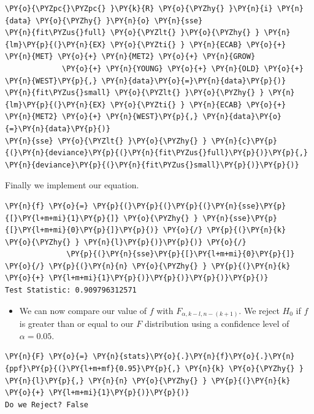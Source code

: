\documentclass[10pt]{article}\usepackage[]{graphicx}\usepackage[]{xcolor}
\begin{document}
    \begin{Verbatim}[commandchars=\\\{\}]
\PY{o}{\PYZpc{}\PYZpc{} }\PY{k}{R} \PY{o}{\PYZhy{} }\PY{n}{i} \PY{n}{data} \PY{o}{\PYZhy{} }\PY{n}{o} \PY{n}{sse}
\PY{n}{fit\PYZus{}full} \PY{o}{\PYZlt{} }\PY{o}{\PYZhy{} } \PY{n}{lm}\PY{p}{(}\PY{n}{EX} \PY{o}{\PYZti{} } \PY{n}{ECAB} \PY{o}{+} \PY{n}{MET} \PY{o}{+} \PY{n}{MET2} \PY{o}{+} \PY{n}{GROW}
             \PY{o}{+} \PY{n}{YOUNG} \PY{o}{+} \PY{n}{OLD} \PY{o}{+} \PY{n}{WEST}\PY{p}{,} \PY{n}{data}\PY{o}{=}\PY{n}{data}\PY{p}{)}
\PY{n}{fit\PYZus{}small} \PY{o}{\PYZlt{} }\PY{o}{\PYZhy{} } \PY{n}{lm}\PY{p}{(}\PY{n}{EX} \PY{o}{\PYZti{} } \PY{n}{ECAB} \PY{o}{+} \PY{n}{MET2} \PY{o}{+} \PY{n}{WEST}\PY{p}{,} \PY{n}{data}\PY{o}{=}\PY{n}{data}\PY{p}{)}
\PY{n}{sse} \PY{o}{\PYZlt{} }\PY{o}{\PYZhy{} } \PY{n}{c}\PY{p}{(}\PY{n}{deviance}\PY{p}{(}\PY{n}{fit\PYZus{}full}\PY{p}{)}\PY{p}{,} \PY{n}{deviance}\PY{p}{(}\PY{n}{fit\PYZus{}small}\PY{p}{)}\PY{p}{)}
\end{Verbatim}

    Finally we implement our equation.

\begin{Verbatim}[commandchars=\\\{\}]
\PY{n}{f} \PY{o}{=} \PY{p}{(}\PY{p}{(}\PY{p}{(}\PY{n}{sse}\PY{p}{[}\PY{l+m+mi}{1}\PY{p}{]} \PY{o}{\PYZhy{} } \PY{n}{sse}\PY{p}{[}\PY{l+m+mi}{0}\PY{p}{]}\PY{p}{)} \PY{o}{/} \PY{p}{(}\PY{n}{k} \PY{o}{\PYZhy{} } \PY{n}{l}\PY{p}{)}\PY{p}{)} \PY{o}{/}
              \PY{p}{(}\PY{n}{sse}\PY{p}{[}\PY{l+m+mi}{0}\PY{p}{]} \PY{o}{/} \PY{p}{(}\PY{n}{n} \PY{o}{\PYZhy{} } \PY{p}{(}\PY{n}{k} \PY{o}{+} \PY{l+m+mi}{1}\PY{p}{)}\PY{p}{)}\PY{p}{)}\PY{p}{)}
Test Statistic: 0.909796312571
\end{Verbatim}

    \begin{itemize}
\itemsep1pt\parskip0pt
\item
  We can now compare our value of $f$ with $F_{\alpha, k - l, n - (k + 1)}$. We reject $H_0$ if $f$ is greater than or
  equal to our $F$ distribution using a confidence level of $\alpha = 0.05$.
\end{itemize}

\begin{Verbatim}[commandchars=\\\{\}]
\PY{n}{F} \PY{o}{=} \PY{n}{stats}\PY{o}{.}\PY{n}{f}\PY{o}{.}\PY{n}{ppf}\PY{p}{(}\PY{l+m+mf}{0.95}\PY{p}{,} \PY{n}{k} \PY{o}{\PYZhy{} } \PY{n}{l}\PY{p}{,} \PY{n}{n} \PY{o}{\PYZhy{} } \PY{p}{(}\PY{n}{k} \PY{o}{+} \PY{l+m+mi}{1}\PY{p}{)}\PY{p}{)}
Do we Reject? False
\end{Verbatim}
\end{document}
